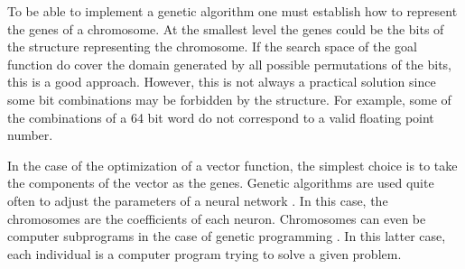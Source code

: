 \documentclass[twoside]{book}
\begin{document}
 To be able to
implement a genetic algorithm one must establish how to represent
the genes of a chromosome. At the smallest level the genes could
be the bits of the structure representing the chromosome. If the
search space of the goal function do cover the domain generated by
all possible permutations of the bits, this is a good approach.
However, this is not always a practical solution since some bit
combinations may be forbidden by the structure. For example, some
of the combinations of a 64 bit word do not correspond to a valid
floating point number.

In the case of the optimization of a vector function, the simplest
choice is to take the components of the vector as the genes.
Genetic algorithms are used quite often to adjust the parameters
of a neural network \cite{BerLin}. In this case, the chromosomes
are the coefficients of each neuron. Chromosomes can even be
computer subprograms in the case of genetic programming
\cite{Koza}. In this latter case, each individual is a computer
program trying to solve a given problem.
\end{document}
